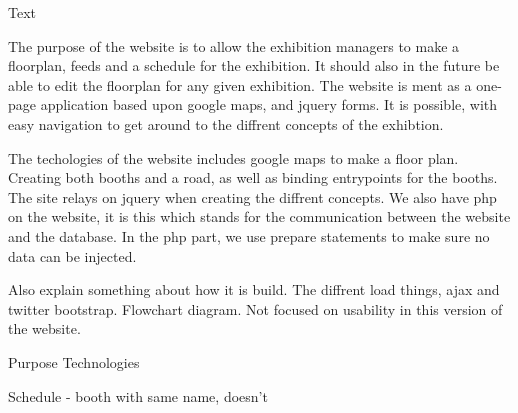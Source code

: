 Text

The purpose of the website is to allow the exhibition managers to make a floorplan, feeds and a schedule for the exhibition.
It should also in the future be able to edit the floorplan for any given exhibition.
The website is ment as a one-page application based upon google maps, and jquery forms.
It is possible, with easy navigation to get around to the diffrent concepts of the exhibtion.

The techologies of the website includes google maps to make a floor plan. Creating both booths and a road, as well as binding entrypoints for the booths. The site relays on jquery when creating the diffrent concepts.
We also have php on the website, it is this which stands for the communication between the website and the database.
In the php part, we use prepare statements to make sure no data can be injected.

Also explain something about how it is build. The diffrent load things, ajax and twitter bootstrap. Flowchart diagram.
Not focused on usability in this version of the website.




Purpose
Technologies

Schedule - booth with same name, doesn't 